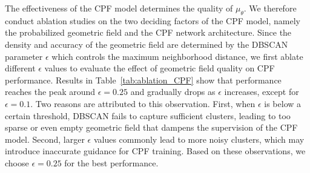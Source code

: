 \documentclass[lettersize,journal]{IEEEtran}
\begin{document}
\begin{table}[h]
\centering
\caption{Ablation studies of geometric field and CPF model, evaluated on Tanks \& Temples~\cite{tankstemples} with coverage gap of 60$^\circ$. Best results within each group are highlighted in bold.}
\label{tab:ablation_CPF}
\end{table}


The effectiveness of the CPF model determines the quality of $\mu_{\theta}$. 
We therefore conduct ablation studies on the two deciding factors of the CPF model, 
namely the probabilized geometric field and the CPF network architecture.
Since the density and accuracy of the geometric field are determined by the DBSCAN parameter $\epsilon$ which controls the maximum neighborhood distance, we first ablate different $\epsilon$ values to evaluate the effect of geometric field quality on CPF performance.
Results in Table~\ref{tab:ablation_CPF} show that performance reaches the peak around $\epsilon = 0.25$ and gradually drops as $\epsilon$ increases, except for $\epsilon = 0.1$. Two reasons are attributed to this observation. 
First, when $\epsilon$ is below a certain threshold, DBSCAN fails to capture sufficient clusters, leading to too sparse or even empty geometric field that dampens the supervision of the CPF model. 
Second, larger $\epsilon$ values commonly lead to more noisy clusters, which may introduce inaccurate guidance for CPF training. 
Based on these observations, we choose $\epsilon = 0.25$ for the best performance.
\end{document}
